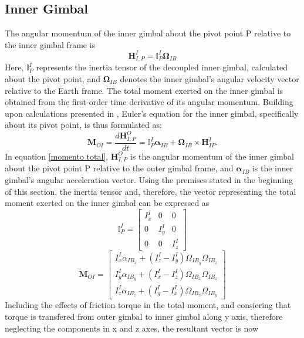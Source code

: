 \subsection{Inner Gimbal}
The angular momentum of the inner gimbal about the pivot point P relative to the inner gimbal frame is
\begin{equation}
   \mathbf{H}^I_{I,P} = \mathbb{I}^I_P \mathbf{\Omega}_{IB}
\end{equation}
Here, $\mathbb{I}^I_P$ represents the inertia tensor of the decoupled inner gimbal, calculated about the pivot point, and $\mathbf{\Omega}_{IB}$ denotes the inner gimbal's angular velocity vector relative to the Earth frame. The total moment exerted on the inner gimbal is obtained from the first-order time derivative of its angular momentum. Building upon calculations presented in , Euler's equation for the inner gimbal, specifically about its pivot point, is thus formulated as:
\begin{equation}
   \label{momento total}
   \mathbf{M}_{OI} = \frac{d\mathbf{H}^O_{I,P}}{dt} = \mathbb{I}^I_P \bm{\alpha}_{IB} + \mathbf{\Omega}_{IB} \times \mathbf{H}^I_{IP}.
\end{equation}
In equation \ref{momento total}, $\mathbf{H}^O_{I,P}$ is the angular momentum of the inner gimbal about the pivot point P relative to the outer gimbal frame, and $\bm{\alpha}_{IB}$ is the inner gimbal's angular acceleration vector. Using the premises stated in the beginning of this section, the inertia tensor and, therefore, the vector representing the total moment exerted on the inner gimbal can be expressed as
\begin{equation}
   \mathbb{I}^I_P = \left[ \begin{matrix}I^I_x & 0 & 0 \\ 0 & I^I_y & 0 \\ 0 & 0 & I^I_z\end{matrix}\right]
\end{equation}
\begin{equation}
   \mathbf{M}_{OI} = \left[ \begin{matrix}I^I_x \alpha_{IB_x} + (I^I_z - I^I_y) \Omega_{IB_y} \Omega_{IB_z} \\ I^I_y \alpha_{IB_y} + (I^I_x - I^I_z) \Omega_{IB_x} \Omega_{IB_z} \\ I^I_z \alpha_{IB_z} + (I^I_y - I^I_x) \Omega_{IB_x} \Omega_{IB_y}\end{matrix}\right]
\end{equation}
Including the effects of friction torque in the total moment, and consiering that torque is transfered from outer gimbal to inner gimbal along y axis, therefore neglecting the components in x and z axes, the resultant vector is now
